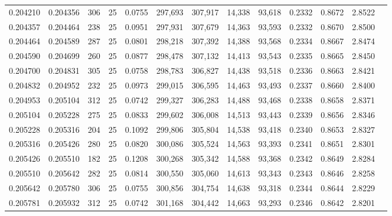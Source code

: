 \begin{tabular}{rrrrrrrrrrrrr}
0.204210 & 0.204356 &   306 &  25 &                                     0.0755 & 297,693 & 307,917 &  14,338 &  93,618 & 0.2332 & 0.8672 & 2.8522 \\
0.204357 & 0.204464 &   238 &  25 &                                     0.0951 & 297,931 & 307,679 &  14,363 &  93,593 & 0.2332 & 0.8670 & 2.8500 \\
0.204464 & 0.204589 &   287 &  25 &                                     0.0801 & 298,218 & 307,392 &  14,388 &  93,568 & 0.2334 & 0.8667 & 2.8474 \\
0.204590 & 0.204699 &   260 &  25 &                                     0.0877 & 298,478 & 307,132 &  14,413 &  93,543 & 0.2335 & 0.8665 & 2.8450 \\
0.204700 & 0.204831 &   305 &  25 &                                     0.0758 & 298,783 & 306,827 &  14,438 &  93,518 & 0.2336 & 0.8663 & 2.8421 \\
0.204832 & 0.204952 &   232 &  25 &                                     0.0973 & 299,015 & 306,595 &  14,463 &  93,493 & 0.2337 & 0.8660 & 2.8400 \\
0.204953 & 0.205104 &   312 &  25 &                                     0.0742 & 299,327 & 306,283 &  14,488 &  93,468 & 0.2338 & 0.8658 & 2.8371 \\
0.205104 & 0.205228 &   275 &  25 &                                     0.0833 & 299,602 & 306,008 &  14,513 &  93,443 & 0.2339 & 0.8656 & 2.8346 \\
0.205228 & 0.205316 &   204 &  25 &                                     0.1092 & 299,806 & 305,804 &  14,538 &  93,418 & 0.2340 & 0.8653 & 2.8327 \\
0.205316 & 0.205426 &   280 &  25 &                                     0.0820 & 300,086 & 305,524 &  14,563 &  93,393 & 0.2341 & 0.8651 & 2.8301 \\
0.205426 & 0.205510 &   182 &  25 &                                     0.1208 & 300,268 & 305,342 &  14,588 &  93,368 & 0.2342 & 0.8649 & 2.8284 \\
0.205510 & 0.205642 &   282 &  25 &                                     0.0814 & 300,550 & 305,060 &  14,613 &  93,343 & 0.2343 & 0.8646 & 2.8258 \\
0.205642 & 0.205780 &   306 &  25 &                                     0.0755 & 300,856 & 304,754 &  14,638 &  93,318 & 0.2344 & 0.8644 & 2.8229 \\
0.205781 & 0.205932 &   312 &  25 &                                     0.0742 & 301,168 & 304,442 &  14,663 &  93,293 & 0.2346 & 0.8642 & 2.8201 \\

\end{tabular}
